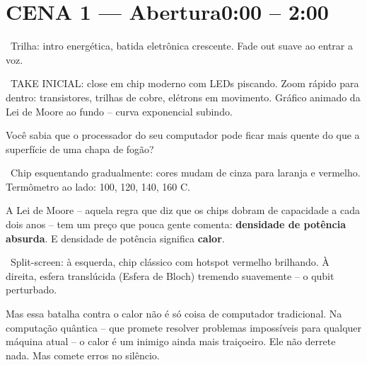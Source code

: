 \section{CENA 1 --- Abertura\hfill\normalfont\small\color{corTempo}0:00 -- 2:00}


\begin{audiocue}
\faMusic\ Trilha: intro energética, batida eletrônica crescente. Fade out suave ao entrar a voz.
\end{audiocue}

\begin{visual}
\faFilm\ TAKE INICIAL: close em chip moderno com LEDs piscando. Zoom rápido para dentro:
transistores, trilhas de cobre, elétrons em movimento. Gráfico animado da Lei de Moore
ao fundo -- curva exponencial subindo.
\end{visual}


\begin{fala}
Você sabia que o processador do seu computador pode ficar mais quente do que a superfície de uma chapa de fogão?
\end{fala}

\begin{visual}
\faFilm\ Chip esquentando gradualmente: cores mudam de cinza para laranja e vermelho.
Termômetro ao lado: 100, 120, 140, 160 {\textdegree}C.
\end{visual}

\begin{fala}
A Lei de Moore -- aquela regra que diz que os chips dobram de capacidade a cada
dois anos -- tem um preço que pouca gente comenta: \textbf{densidade de potência
absurda}. E densidade de potência significa \textbf{calor}.
\end{fala}


\begin{visual}
\faFilm\ Split-screen: à esquerda, chip clássico com hotspot vermelho brilhando.
À direita, esfera translúcida (Esfera de Bloch) tremendo suavemente -- o qubit perturbado.
\end{visual}

\begin{fala}
Mas essa batalha contra o calor não é só coisa de computador tradicional.
Na computação quântica -- que promete resolver problemas impossíveis para qualquer
máquina atual -- o calor é um inimigo ainda mais traiçoeiro.
Ele não derrete nada. Mas comete erros no silêncio.
\end{fala}


